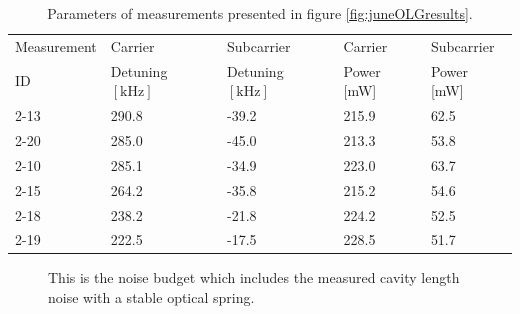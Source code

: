 \begin{table}
  \begin{center}
    \footnotesize
    \begin{tabular}{|l|l|l|l|l|}
      \hline
      Measurement & Carrier & Subcarrier & Carrier & Subcarrier \\
      ID & Detuning $[\mathrm{kHz}]$ & Detuning $[\mathrm{kHz}]$ &
        Power [mW] & Power [mW] \\
      \hline
      \hline
      2-13 & 290.8  & -39.2  & 215.9 & 62.5 \\
      2-20 & 285.0  & -45.0  & 213.3 & 53.8 \\
      2-10 & 285.1  & -34.9  & 223.0 & 63.7 \\
      2-15 & 264.2  & -35.8  & 215.2 & 54.6 \\
      2-18 & 238.2  & -21.8  & 224.2 & 52.5 \\
      2-19 & 222.5  & -17.5  & 228.5 & 51.7 \\
      \hline
    \end{tabular}
  \end{center}
  \caption[Optical Trap, 2nd Edition Optical Spring Fit Parametrers]{
      Parameters of measurements presented in figure \ref{fig:juneOLGresults}.
      }
  \label{tab:experiment2fitparams}
\end{table}

\begin{figure}
    \caption[Estimate of Passively Attenuated Noise]{
    This is the noise budget which includes the measured
    cavity length noise with a stable optical spring.
    }
  \label{fig:noisepassive}
\end{figure}


